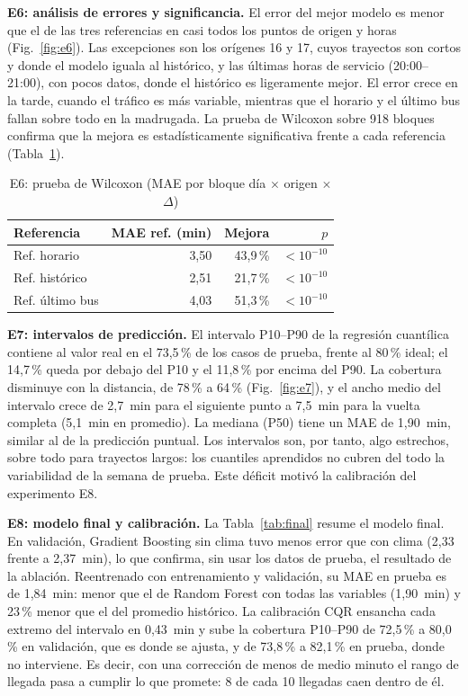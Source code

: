 \documentclass[conference,a4paper]{IEEEtran}
\begin{document}
\textbf{E6: análisis de errores y significancia.} El error del mejor modelo es menor que el de las tres referencias en casi todos los puntos de origen y horas (Fig.~\ref{fig:e6}). Las excepciones son los orígenes 16 y 17, cuyos trayectos son cortos y donde el modelo iguala al histórico, y las últimas horas de servicio (20:00--21:00), con pocos datos, donde el histórico es ligeramente mejor. El error crece en la tarde, cuando el tráfico es más variable, mientras que el horario y el último bus fallan sobre todo en la madrugada. La prueba de Wilcoxon sobre 918 bloques confirma que la mejora es estadísticamente significativa frente a cada referencia (Tabla~\ref{tab:w}).

\begin{table}[t]
\centering
\caption{E6: prueba de Wilcoxon (MAE por bloque día $\times$ origen $\times$ $\Delta$)}
\label{tab:w}
\footnotesize
\begin{tabular}{@{}lrrr@{}}
\toprule
Referencia & MAE ref. (min) & Mejora & $p$ \\
\midrule
Ref. horario & 3,50 & 43,9\,\% & $<10^{-10}$ \\
Ref. histórico & 2,51 & 21,7\,\% & $<10^{-10}$ \\
Ref. último bus & 4,03 & 51,3\,\% & $<10^{-10}$ \\
\bottomrule
\end{tabular}
\end{table}

\textbf{E7: intervalos de predicción.} El intervalo P10--P90 de la regresión cuantílica contiene al valor real en el 73,5\,\% de los casos de prueba, frente al 80\,\% ideal; el 14,7\,\% queda por debajo del P10 y el 11,8\,\% por encima del P90. La cobertura disminuye con la distancia, de 78\,\% a 64\,\% (Fig.~\ref{fig:e7}), y el ancho medio del intervalo crece de 2,7~min para el siguiente punto a 7,5~min para la vuelta completa (5,1~min en promedio). La mediana (P50) tiene un MAE de 1,90~min, similar al de la predicción puntual. Los intervalos son, por tanto, algo estrechos, sobre todo para trayectos largos: los cuantiles aprendidos no cubren del todo la variabilidad de la semana de prueba. Este déficit motivó la calibración del experimento E8.

\textbf{E8: modelo final y calibración.} La Tabla~\ref{tab:final} resume el modelo final. En validación, Gradient Boosting sin clima tuvo menos error que con clima (2,33 frente a 2,37~min), lo que confirma, sin usar los datos de prueba, el resultado de la ablación. Reentrenado con entrenamiento y validación, su MAE en prueba es de 1,84~min: menor que el de Random Forest con todas las variables (1,90~min) y 23\,\% menor que el del promedio histórico. La calibración CQR ensancha cada extremo del intervalo en 0,43~min y sube la cobertura P10--P90 de 72,5\,\% a 80,0\,\% en validación, que es donde se ajusta, y de 73,8\,\% a 82,1\,\% en prueba, donde no interviene. Es decir, con una corrección de menos de medio minuto el rango de llegada pasa a cumplir lo que promete: 8 de cada 10 llegadas caen dentro de él.
\end{document}
